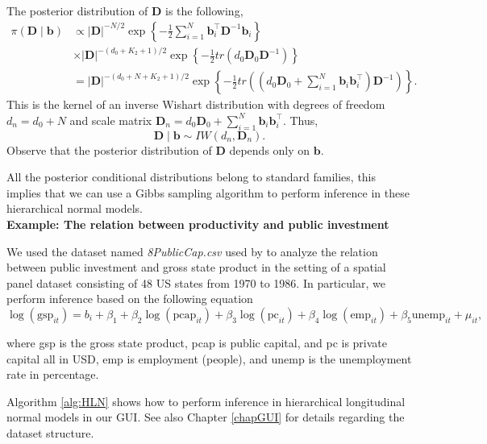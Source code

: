 The posterior distribution of $\bm{D}$ is the following,
\begin{align*}
	\pi(\bm{D}\mid \bm{b})&\propto  |\bm{D}|^{-N/2} \exp\left\{-\frac{1}{2}\sum_{i=1}^N \bm{b}_i^{\top}\bm{D}^{-1}\bm{b}_i\right\}\\
	&\times |\bm{D}|^{-(d_0+K_2+1)/2}\exp\left\{-\frac{1}{2}tr(d_0\bm{D}_0\bm{D}^{-1})\right\}\\
	&=|\bm{D}|^{-(d_0+N+K_2+1)/2}\exp\left\{-\frac{1}{2}tr\left(\left(d_0\bm{D}_0+\sum_{i=1}^N\bm{b}_i\bm{b}_i^{\top}\right)\bm{D}^{-1}\right) \right\}. 
\end{align*}
This is the kernel of an inverse Wishart distribution with degrees of freedom $d_n=d_0+N$ and scale matrix $\bm{D}_n=d_0\bm{D}_0+\sum_{i=1}^N\bm{b}_i\bm{b}_i^{\top}$. Thus,   
\begin{equation*}
	\bm{D}\mid  \bm{b} \sim {I}{W}(d_n, \bm{D}_n).
\end{equation*}
Observe that the posterior distribution of $\bm{D}$ depends only on $\bm{b}$. 

All the posterior conditional distributions belong to standard families, this implies that we can use a Gibbs sampling algorithm to perform inference in these hierarchical normal models.\\

\textbf{Example: The relation between productivity and public investment}

We used the dataset named \textit{8PublicCap.csv} used by \cite{Ramirez2017} to analyze the relation  between public investment and gross state product in the setting of a spatial panel dataset consisting of 48 US states from 1970 to 1986.
In particular, we perform inference based on the following equation 
\begin{equation*}
	\log(\text{gsp}_{it})=b_i+\beta_1+\beta_2\log(\text{pcap}_{it})+\beta_3\log(\text{pc}_{it})+\beta_4\log(\text{emp}_{it})+\beta_5\text{unemp}_{it}+\mu_{it},
\end{equation*}

where gsp is the gross state product, pcap is public capital, and pc is private capital all in USD, emp is employment (people), and unemp is the unemployment rate in percentage.

Algorithm \ref{alg:HLN} shows how to perform inference in hierarchical longitudinal normal models in our GUI. See also Chapter \ref{chapGUI} for details regarding the dataset structure.

